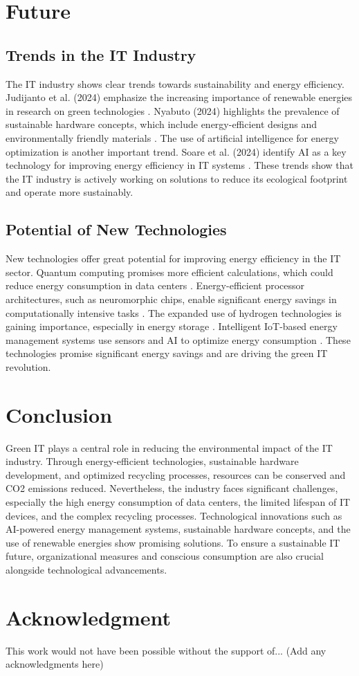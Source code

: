 \documentclass[10pt,twocolumn,conference]{IEEEtran}
\begin{document}
\section{Future}

\subsection{Trends in the IT Industry}
The IT industry shows clear trends towards sustainability and energy efficiency. Judijanto et al. (2024) emphasize the increasing importance of renewable energies in research on green technologies \cite{judijanto2024}. Nyabuto (2024) highlights the prevalence of sustainable hardware concepts, which include energy-efficient designs and environmentally friendly materials \cite{nyabuto2024}. The use of artificial intelligence for energy optimization is another important trend. Soare et al. (2024) identify AI as a key technology for improving energy efficiency in IT systems \cite{soare2024}. These trends show that the IT industry is actively working on solutions to reduce its ecological footprint and operate more sustainably.

\subsection{Potential of New Technologies}
New technologies offer great potential for improving energy efficiency in the IT sector. Quantum computing promises more efficient calculations, which could reduce energy consumption in data centers \cite{soare2024}. Energy-efficient processor architectures, such as neuromorphic chips, enable significant energy savings in computationally intensive tasks \cite{nyabuto2024}. The expanded use of hydrogen technologies is gaining importance, especially in energy storage \cite{judijanto2024}. Intelligent IoT-based energy management systems use sensors and AI to optimize energy consumption \cite{soare2024}. These technologies promise significant energy savings and are driving the green IT revolution.

\section{Conclusion}
Green IT plays a central role in reducing the environmental impact of the IT industry. Through energy-efficient technologies, sustainable hardware development, and optimized recycling processes, resources can be conserved and CO2 emissions reduced. Nevertheless, the industry faces significant challenges, especially the high energy consumption of data centers, the limited lifespan of IT devices, and the complex recycling processes. Technological innovations such as AI-powered energy management systems, sustainable hardware concepts, and the use of renewable energies show promising solutions. To ensure a sustainable IT future, organizational measures and conscious consumption are also crucial alongside technological advancements.

\section*{Acknowledgment}
This work would not have been possible without the support of... (Add any acknowledgments here)



\end{document}

